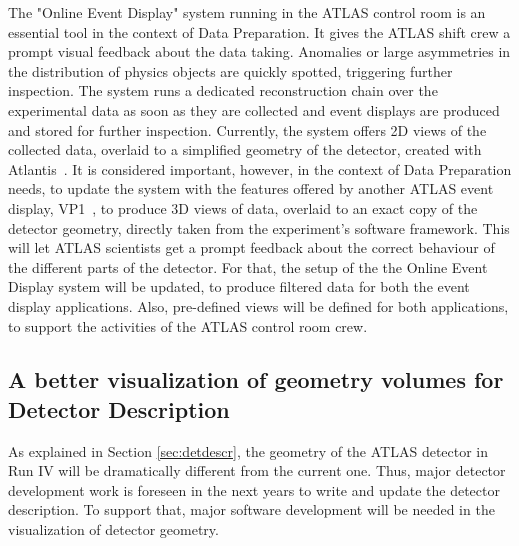 The "Online Event Display" system running in the ATLAS control room is an essential tool in the context of Data Preparation. It gives the ATLAS shift crew a prompt visual feedback about the data taking. Anomalies or large asymmetries in the distribution of physics objects are quickly spotted, triggering further inspection. The system runs a dedicated reconstruction chain over the experimental data as soon as they are collected and event displays are produced and stored for further inspection. 
Currently, the system offers 2D views of the collected data, overlaid to a simplified geometry of the detector, created with Atlantis~\cite{ref:atlantis-web}. It is considered important, however, in the context of Data Preparation needs, to update the system with the features offered by another ATLAS event display, VP1~\cite{ref:vp1-web}, to produce 3D views of data, overlaid to an exact copy of the detector geometry, directly taken from the experiment's software framework. This will let ATLAS scientists get a prompt feedback about the correct behaviour of the different parts of the detector. %
For that, the setup of the the Online Event Display system will be updated, to produce filtered data for both the event display applications. Also, pre-defined views will be defined for both applications, to support the activities of the ATLAS control room crew.



\subsection{A better visualization of geometry volumes for Detector Description}

As explained in Section \ref{sec:detdescr}, the geometry of the ATLAS detector in Run IV will be dramatically different from the current one. Thus, major detector development work is foreseen in the next years to write and update the detector description.%
To support that, major software development will be needed in the visualization of detector geometry. 

